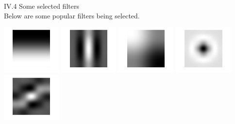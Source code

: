 \documentclass[12pt]{article}
\newenvironment{problem}[2][Part]{\begin{trivlist}
\item[\hskip \labelsep {\bfseries #1}\hskip \labelsep {\bfseries #2}]}{\end{trivlist}}
\begin{document}
\begin{problem}{IV Results}
\begin{center}
\end{center}
\item{IV.4 Some selected filters}\\
Below are some popular filters being selected.
\begin{center}
	\includegraphics[width=3cm]{Code/Results/selected_filter_1.png}
	\includegraphics[width=3cm]{Code/Results/selected_filter_2.png}
	\includegraphics[width=3cm]{Code/Results/selected_filter_3.png}
	\includegraphics[width=3cm]{Code/Results/selected_filter_5.png}
	\includegraphics[width=3cm]{Code/Results/selected_filter_6.png}
\end{center}
\end{problem}

 
\end{document}
